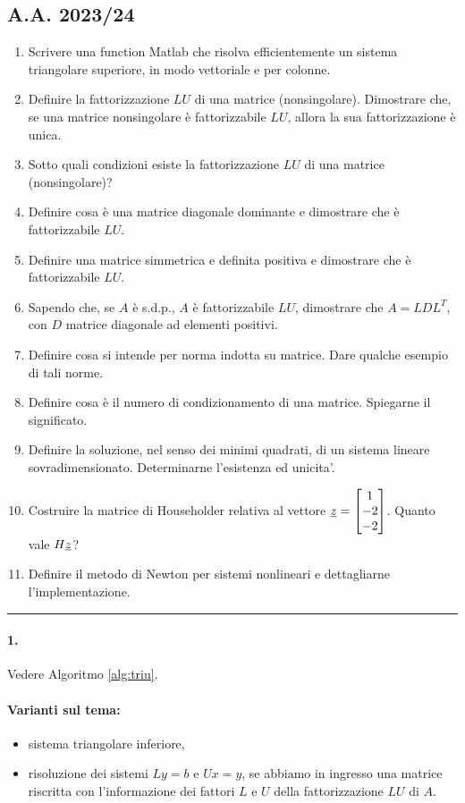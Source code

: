 \subsection{A.A. 2023/24}
\begin{enumerate}
	\item Scrivere una function Matlab che risolva efficientemente un sistema triangolare superiore, in modo vettoriale e per colonne.
	\item Definire la fattorizzazione $LU$ di una matrice (\gls{nonsingolare}). Dimostrare che, se una matrice nonsingolare è fattorizzabile $LU$, allora la sua fattorizzazione è unica.
	\item Sotto quali condizioni esiste la fattorizzazione $LU$ di una matrice (nonsingolare)?
	\item Definire cosa è una matrice diagonale dominante e dimostrare che è fattorizzabile $LU$.
	\item Definire una matrice simmetrica e definita positiva e dimostrare che è fattorizzabile $LU$.
	\item Sapendo che, se $A$ è s.d.p., $A$ è fattorizzabile $LU$, dimostrare che $A=LDL^T$, con $D$ matrice diagonale ad elementi positivi.
	\item Definire cosa si intende per norma indotta su matrice. Dare qualche esempio di tali norme.
	\item Definire cosa è il numero di condizionamento di una matrice. Spiegarne il significato.
	\item Definire la soluzione, nel senso dei minimi quadrati, di un sistema lineare sovradimensionato. Determinarne l'esistenza ed unicita'.
	\item Costruire la matrice di Householder relativa al vettore $\uline z = \begin{bmatrix}
		1\\
		-2\\
		-2
	\end{bmatrix}$. Quanto vale $H\uline z$?
	\item Definire il metodo di Newton per sistemi nonlineari e dettagliarne l'implementazione.
\end{enumerate}

\hrule

\paragraph{1.} Vedere Algoritmo \ref{alg:triu}.
\paragraph{Varianti sul tema:}
\begin{itemize}
	\item sistema triangolare inferiore,
	\item risoluzione dei sistemi $Ly=b$ e $Ux=y$, se abbiamo in ingresso una matrice riscritta con l'informazione dei fattori $L$ e $U$ della fattorizzazione $LU$ di $A$.
\end{itemize}

